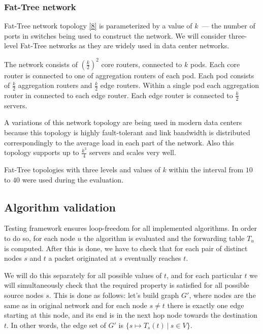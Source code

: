 \subsubsection{Fat-Tree network}

 Fat-Tree network topology \hyperref[ref:fat]{[8]} is parameterized by a value of $k$~--- the number of ports in switches being used to construct the network. We will consider three-level Fat-Tree networks as they are widely used in data center networks.
 
 The network consists of $\left( \frac{k}{2} \right)^2$ core routers, connected to $k$ pods. Each core router is connected to one of aggregation routers of each pod. Each pod consists of $\frac{k}{2}$ aggregation routers and $\frac{k}{2}$ edge routers. Within a single pod each aggregation router in connected to each edge router. Each edge router is connected to $\frac{k}{2}$ servers.
 
 A variations of this network topology are being used in modern data centers because this topology is highly fault-tolerant and link bandwidth is distributed correspondingly to the average load in each part of the network. Also this topology supports up to $\frac{k^3}{4}$ servers and scales very well.
 
 Fat-Tree topologies with three levels and values of $k$ within the interval from $10$ to $40$ were used during the evaluation.

\subsection{Algorithm validation}

Testing framework ensures loop-freedom for all implemented algorithms. In order to do so, for each node $u$ the algorithm is evaluated and the forwarding table $T_u$ is computed. After this is done, we have to check that for each pair of distinct nodes $s$ and $t$ a packet originated at $s$ eventually reaches $t$.

We will do this separately for all possible values of $t$, and for each particular $t$ we will simultaneously check that the required property is satisfied for all possible source nodes $s$. This is done as follows: let's build graph $G'$, where nodes are the same as in original network and for each node $s \neq t$ there is exactly one edge starting at this node, and its end is in the next hop node towards the destination $t$. In other words, the edge set of $G'$ is $\{s \mapsto T_s(t) ~|~s \in V\}$.

